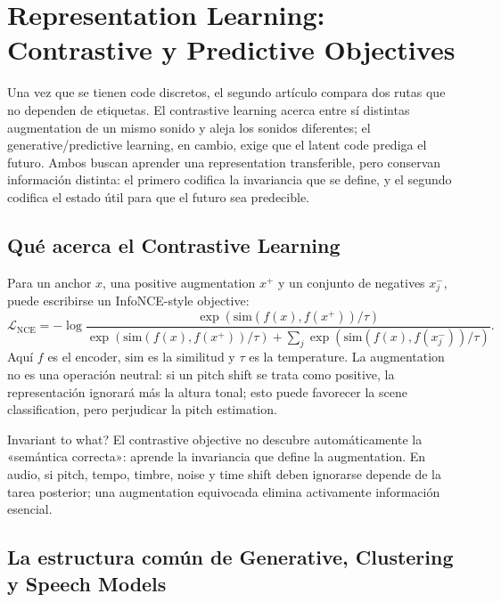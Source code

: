 \section{Representation Learning: Contrastive y Predictive Objectives}

Una vez que se tienen code discretos, el segundo artículo compara dos rutas que no dependen de etiquetas. El contrastive learning acerca entre sí distintas augmentation de un mismo sonido y aleja los sonidos diferentes; el generative/predictive learning, en cambio, exige que el latent code prediga el futuro. Ambos buscan aprender una representation transferible, pero conservan información distinta: el primero codifica la invariancia que se define, y el segundo codifica el estado útil para que el futuro sea predecible.

\subsection{Qué acerca el Contrastive Learning}

Para un anchor $x$, una positive augmentation $x^+$ y un conjunto de negatives $x_j^-$, puede escribirse un InfoNCE-style objective:
\[
\mathcal{L}_{\mathrm{NCE}}
=-\log
\frac{\exp(\mathrm{sim}(f(x),f(x^+))/\tau)}
{\exp(\mathrm{sim}(f(x),f(x^+))/\tau)
+\sum_j\exp(\mathrm{sim}(f(x),f(x_j^-))/\tau)}.
\]
Aquí $f$ es el encoder, $\mathrm{sim}$ es la similitud y $\tau$ es la temperature. La augmentation no es una operación neutral: si un pitch shift se trata como positive, la representación ignorará más la altura tonal; esto puede favorecer la scene classification, pero perjudicar la pitch estimation.


\begin{warningbox}{Invariant to what?}
El contrastive objective no descubre automáticamente la «semántica correcta»: aprende la invariancia que define la augmentation. En audio, si pitch, tempo, timbre, noise y time shift deben ignorarse depende de la tarea posterior; una augmentation equivocada elimina activamente información esencial.
\end{warningbox}

\subsection{La estructura común de Generative, Clustering y Speech Models}

